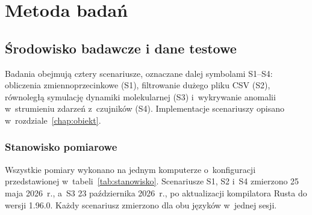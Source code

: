 \chapter{Metoda badań}
\label{chap:metoda}


\section{Środowisko badawcze i dane testowe}
\label{sec:srodowisko}

Badania obejmują cztery scenariusze, oznaczane dalej symbolami S1--S4: obliczenia zmiennoprzecinkowe (S1), filtrowanie dużego pliku CSV (S2), równoległą symulację dynamiki molekularnej (S3) i~wykrywanie anomalii w~strumieniu zdarzeń z~czujników (S4).
Implementacje scenariuszy opisano w~rozdziale~\ref{chap:obiekt}.

\subsection{Stanowisko pomiarowe}
\label{subsec:stanowisko}

Wszystkie pomiary wykonano na jednym komputerze o~konfiguracji przedstawionej w~tabeli~\ref{tab:stanowisko}.
Scenariusze S1, S2 i~S4 zmierzono 25 maja 2026~r., a~S3 23 października 2026~r., po aktualizacji kompilatora Rusta do wersji 1.96.0.
Każdy scenariusz zmierzono dla obu języków w~jednej sesji.

